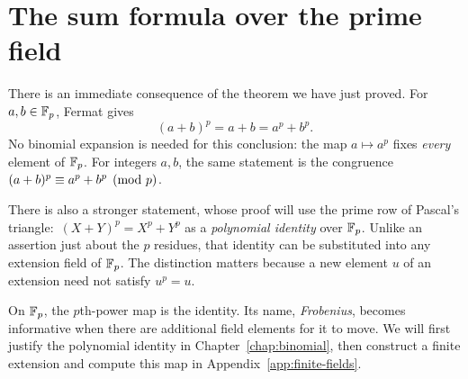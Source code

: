 \section{The sum formula over the prime field}
\label{sec:fermat-sum}

There is an immediate consequence of the theorem we have just proved.
For $a,b\in\mathbb F_p$, Fermat gives
\[
 (a+b)^p=a+b=a^p+b^p.
\]
No binomial expansion is needed for this conclusion: the map
$a\mapsto a^p$ fixes \emph{every} element of $\mathbb F_p$.
For integers $a,b$, the same statement is the congruence
$(a+b)^p\equiv a^p+b^p\pmod p$.

There is also a stronger statement, whose proof will use the prime row
of Pascal's triangle: $\,(X+Y)^p=X^p+Y^p$ as a \emph{polynomial identity}
over $\mathbb F_p$. Unlike an assertion just about the $p$ residues, that identity
can be substituted into any extension field of $\mathbb F_p$.
The distinction matters because a new element $u$ of an extension need
not satisfy $u^p=u$.

\begin{bigidea}
On $\mathbb F_p$, the $p$th-power map is the identity. Its name,
\emph{Frobenius}, becomes informative when there are additional field
elements for it to move. We will first justify the polynomial identity
in Chapter~\ref{chap:binomial}, then construct a finite extension and
compute this map in Appendix~\ref{app:finite-fields}.
\end{bigidea}





